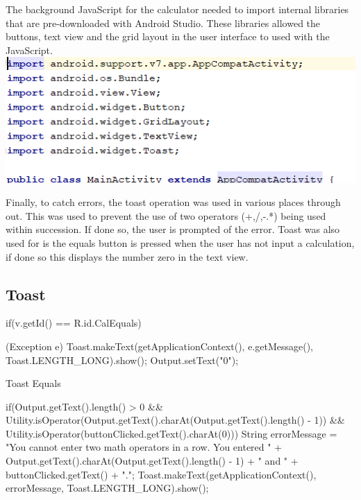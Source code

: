 \documentclass[10pt, a4paper]{article}
\begin{document}
	The background JavaScript for the calculator needed to import internal libraries that are pre-downloaded with Android Studio.
	These libraries allowed the buttons, text view and the grid layout in the user interface to used with the JavaScript.
	\includegraphics{Import.png}
	
	Finally, to catch errors, the toast operation was used in various places through out. This was used to prevent the use of two operators (+,/,-.*)
	being used within succession. If done so, the user is prompted of the error.
	Toast was also used for is the equals button is pressed when the user has not input a calculation, if done so this displays the number zero in the text view.
	
	\subsection{Toast}
	\begin{CodeEquals}
	            \else if(v.getId() == R.id.CalEquals){
					
                    \catch(Exception e){
                        Toast.makeText(getApplicationContext(), e.getMessage(), Toast.LENGTH_LONG).show();
                        Output.setText("0");
                    }
                }
	\caption{Toast Equals}
	\end{CodeEquals}
	
	\begin{CodeOperator}
	                \else if(Output.getText().length() > 0 &&
                        Utility.isOperator(Output.getText().charAt(Output.getText().length() - 1)) &&
                        Utility.isOperator(buttonClicked.getText().charAt(0)))
						{
							String errorMessage = "You cannot enter two math operators in a row. You entered " + Output.getText().charAt(Output.getText().length() - 1) + " and " + buttonClicked.getText() + ".";
							Toast.makeText(getApplicationContext(), errorMessage, Toast.LENGTH_LONG).show();
						}

	\end{CodeOperator}
	
\end{document}
